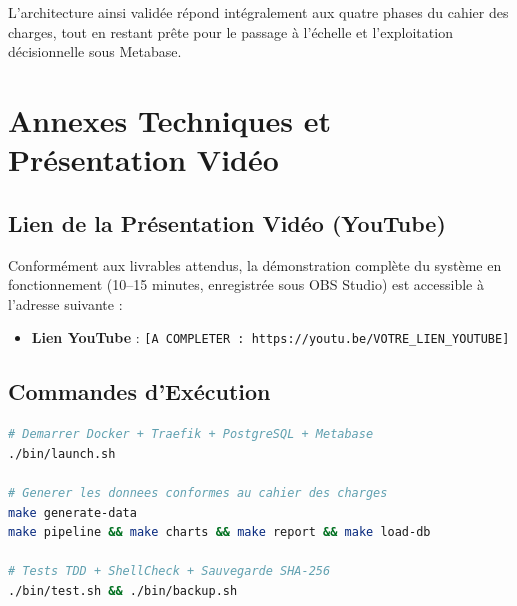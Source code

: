 \documentclass[11pt,a4paper]{article}
\begin{document}
L'architecture ainsi valid\'ee r\'epond int\'egralement aux quatre phases du cahier des charges, tout en restant pr\^ete pour le passage \`a l'\'echelle et l'exploitation d\'ecisionnelle sous Metabase.

\section{Annexes Techniques et Pr\'esentation Vid\'eo}

\subsection{Lien de la Pr\'esentation Vid\'eo (YouTube)}
Conform\'ement aux livrables attendus, la d\'emonstration compl\`ete du syst\`eme en fonctionnement (10--15 minutes, enregistr\'ee sous OBS Studio) est accessible \`a l'adresse suivante :
\begin{itemize}
    \item \textbf{Lien YouTube} : \texttt{[A COMPLETER : https://youtu.be/VOTRE\_LIEN\_YOUTUBE]}
\end{itemize}

\subsection{Commandes d'Ex\'ecution}
\begin{lstlisting}[language=bash]
# Demarrer Docker + Traefik + PostgreSQL + Metabase
./bin/launch.sh

# Generer les donnees conformes au cahier des charges
make generate-data
make pipeline && make charts && make report && make load-db

# Tests TDD + ShellCheck + Sauvegarde SHA-256
./bin/test.sh && ./bin/backup.sh
\end{lstlisting}
\end{document}
